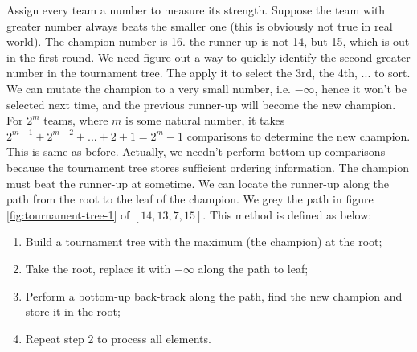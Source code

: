 \documentclass[b5paper]{article}
\begin{document}
Assign every team a number to measure its strength. Suppose the team with greater number always beats the smaller one (this is obviously not true in real world). The champion number is 16. the runner-up is not 14, but 15, which is out in the first round. We need figure out a way to quickly identify the second greater number in the tournament tree. The apply it to select the 3rd, the 4th, ... to sort. We can mutate the champion to a very small number, i.e. $-\infty$, hence it won't be selected next time, and the previous runner-up will become the new champion. For $2^m$ teams, where $m$ is some natural number, it takes $2^{m-1} + 2^{m-2} + ... + 2 + 1 = 2^m - 1$ comparisons to determine the new champion. This is same as before. Actually, we needn't perform bottom-up comparisons because the tournament tree
stores sufficient ordering information. The champion must beat the runner-up at sometime. We can locate the runner-up along the path from the root to the leaf of the champion. We grey the path in figure \ref{fig:tournament-tree-1} of $[14, 13, 7, 15]$. This method is defined as below:

\begin{enumerate}
\item Build a tournament tree with the maximum (the champion) at the root;
\item Take the root, replace it with $-\infty$ along the path to leaf;
\item Perform a bottom-up back-track along the path, find the new champion and store it in the root;
\item Repeat step 2 to process all elements.
\end{enumerate}
\end{document}
